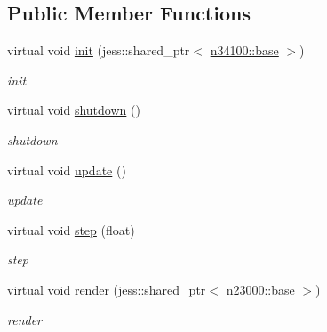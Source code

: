 \subsection*{Public Member Functions}
\begin{DoxyCompactItemize}
\item 
virtual void \hyperlink{classnebula_1_1content_1_1actor_1_1renderer_1_1rigid__body_afd1175cdc7b35a918db4bd89c59463f0}{init} (jess::shared\_\-ptr$<$ \hyperlink{classnebula_1_1content_1_1actor_1_1admin_1_1base}{n34100::base} $>$)
\begin{DoxyCompactList}\small\item\em init \item\end{DoxyCompactList}\item 
virtual void \hyperlink{classnebula_1_1content_1_1actor_1_1renderer_1_1rigid__body_a24b3051c9db06008d8698cc97eff21e0}{shutdown} ()
\begin{DoxyCompactList}\small\item\em shutdown \item\end{DoxyCompactList}\item 
virtual void \hyperlink{classnebula_1_1content_1_1actor_1_1renderer_1_1rigid__body_a11f37d90346888f7dc70cae54954a584}{update} ()
\begin{DoxyCompactList}\small\item\em update \item\end{DoxyCompactList}\item 
virtual void \hyperlink{classnebula_1_1content_1_1actor_1_1renderer_1_1rigid__body_a5e76495c7870d3b88c5b32888f9fa504}{step} (float)
\begin{DoxyCompactList}\small\item\em step \item\end{DoxyCompactList}\item 
virtual void \hyperlink{classnebula_1_1content_1_1actor_1_1renderer_1_1rigid__body_ae3a3c72c7306b9ee55eb75abf36e7476}{render} (jess::shared\_\-ptr$<$ \hyperlink{classnebula_1_1platform_1_1renderer_1_1base}{n23000::base} $>$)
\begin{DoxyCompactList}\small\item\em render \item\end{DoxyCompactList}\end{DoxyCompactItemize}
